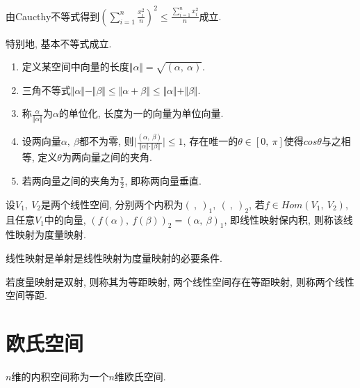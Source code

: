 \begin{example}
    由Caucthy不等式得到$(\sum_{i=1}^n\frac{x_i^2}{n})^2\le \frac{\sum_{i=1}^nx_i^2}{n}$成立.\par
    特别地, 基本不等式成立.
\end{example}

\begin{definition}[内积的几何性概念]
    \par
    \begin{enumerate}[itemindent=1em]
        \item 定义某空间中向量的长度$\Vert \alpha \Vert=\sqrt{(\alpha,\ \alpha)}$.
        \item 三角不等式$\Vert \alpha \Vert-\Vert\beta \Vert \le \Vert \alpha+\beta\Vert \le \Vert\alpha\Vert + \Vert\beta\Vert$.
        \item 称$\frac{\alpha}{\Vert \alpha \Vert}$为$\alpha$的单位化, 长度为一的向量为单位向量.
        \item 设两向量$\alpha,\ \beta$都不为零, 则$\vert\frac{(\alpha,\ \beta)}{\Vert\alpha\Vert\cdot\Vert\beta\Vert}\vert\le 1$, 存在唯一的$\theta\in [0,\ \pi]$使得$cos\theta$与之相等, 定义$\theta$为两向量之间的夹角.
        \item 若两向量之间的夹角为$\frac{\pi}{2}$, 即称两向量垂直.
    \end{enumerate}
\end{definition}

\begin{definition}[度量映射]
    设$V_1,\ V_2$是两个线性空间, 分别两个内积为$(\ ,\ )_1,\ (\ ,\ )_2$, 若$f\in Hom(V_1,\ V_2)$, 且任意$V_1$中的向量, 
    $(f(\alpha),\ f(\beta))_2=(\alpha,\ \beta)_1$, 即线性映射保内积, 则称该线性映射为度量映射.
\end{definition}

\begin{lemma}
    线性映射是单射是线性映射为度量映射的必要条件.
\end{lemma}

\begin{definition}[等距]
    若度量映射是双射, 则称其为等距映射, 两个线性空间存在等距映射, 则称两个线性空间等距.
\end{definition}

\section{ 欧氏空间 }

\begin{definition}[欧氏空间]
    $n$维的内积空间称为一个$n$维欧氏空间.
\end{definition}

